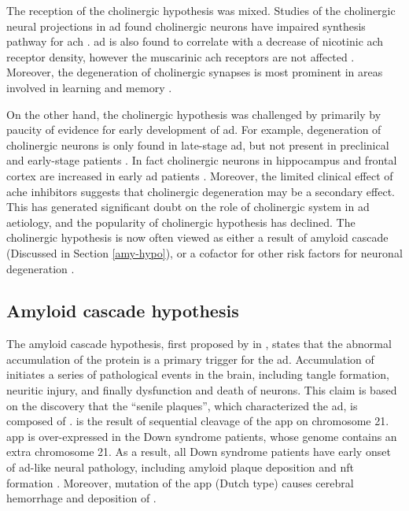The reception of the cholinergic hypothesis was mixed. Studies of the cholinergic neural projections in \gls{ad} found cholinergic neurons have impaired synthesis pathway for \gls{ach} \citep{milner87}. \gls{ad} is also found to correlate with a decrease of nicotinic \gls{ach} receptor density, however the muscarinic \gls{ach} receptors are not affected \citep{nordberg92, burghaus00}. Moreover, the degeneration of cholinergic synapses is most prominent in areas involved in learning and memory \citep{geula96}. 

On the other hand, the cholinergic hypothesis was challenged by primarily by paucity of evidence for early development of \gls{ad}. For example, degeneration of cholinergic neurons is only found in late-stage \gls{ad}, but not present in preclinical and early-stage patients \citep{davis99}. In fact cholinergic neurons in hippocampus and frontal cortex are increased in early \gls{ad} patients \citep{dekosky02}. Moreover, the limited clinical effect of \gls{ache} inhibitors suggests that cholinergic degeneration may be a secondary effect. This has generated significant doubt on the role of cholinergic system in \gls{ad} aetiology, and the popularity of cholinergic hypothesis has declined. The cholinergic hypothesis is now often viewed as either a result of amyloid cascade (Discussed in Section \ref{amy-hypo}), or a cofactor for other risk factors for neuronal degeneration \citep{roberson97, contestabile11}.

\subsection{Amyloid cascade hypothesis\label{amy-hypo}}
The amyloid cascade hypothesis, first proposed by \citeauthor{hardy92} in \citeyear{hardy92}, states that the abnormal accumulation of the protein \abeta{} is a primary trigger for the \gls{ad}. Accumulation of \abeta{} initiates a series of pathological events in the brain, including tangle formation, neuritic injury, and finally dysfunction and death of neurons. This claim is based on the discovery that the ``senile plaques'', which characterized the \gls{ad}, is composed of \abeta{} \citep{masters85}. \abeta{} is the result of sequential cleavage of the \gls{app} on chromosome 21. \Gls{app} is over-expressed in the Down syndrome patients, whose genome contains an extra chromosome 21. As a result, all Down syndrome patients have early onset of \gls{ad}-like neural pathology, including amyloid plaque deposition and \gls{nft} formation \citep{wisniewski85, hardy02}. Moreover, mutation of the \gls{app} (Dutch type) causes cerebral hemorrhage and deposition of \abeta{} \citep{hardy02}.

